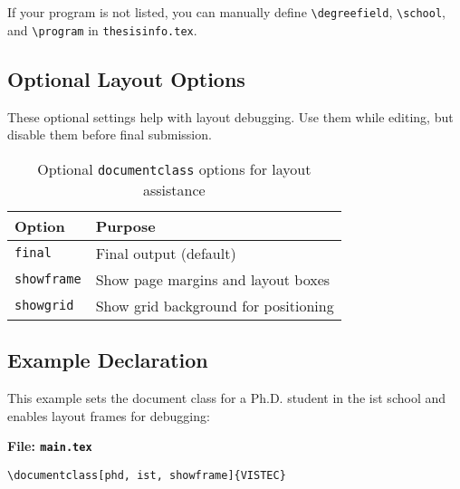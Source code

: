 \documentclass{VISTEC}
\begin{document}
\begin{subparagraph}
If your program is not listed, you can manually define \verb|\degreefield|, \verb|\school|, and \verb|\program| in \texttt{thesisinfo.tex}.
\end{subparagraph}

\subsection{Optional Layout Options}
\label{manual:class-optional}

\begin{subparagraph}
These optional settings help with layout debugging. Use them while editing, but disable them before final submission.
\end{subparagraph}

\begin{table}[ht]
\centering
\caption{Optional \texttt{documentclass} options for layout assistance}
\small\singlespacingplus
\begin{tabular}{ll}
\toprule
\textbf{Option} & \textbf{Purpose} \\
\midrule
\texttt{final}     & Final output (default) \\
\texttt{showframe} & Show page margins and layout boxes \\
\texttt{showgrid}  & Show grid background for positioning \\
\bottomrule
\end{tabular}
\end{table}

\subsection{Example Declaration}
\label{manual:class-example}

\begin{subparagraph}
This example sets the document class for a Ph.D. student in the ist school and enables layout frames for debugging:
\end{subparagraph}

\noindent\textbf{File: \texttt{main.tex}}\vspace{-1.5em}
\begin{verbatim}
\documentclass[phd, ist, showframe]{VISTEC}
\end{verbatim}
\end{document}
